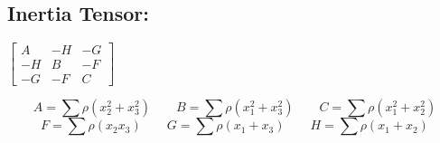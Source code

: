 \subsection{Inertia Tensor:}
$\begin{bmatrix}\label{ma:Inertia Tensor}
  A & -H & -G \\
  -H & B & -F \\
  -G & -F & C
\end{bmatrix}$

\begin{equation}\label{eq:Moments of Inertia}
A=\sum\rho\left({x}_{2}^{2}+{x}_{3}^{2}\right)
\qquad
B=\sum\rho\left({x}_{1}^{2}+{x}_{3}^{2}\right)
\qquad
C=\sum\rho\left({x}_{1}^{2}+{x}_{2}^{2}\right)
\end{equation}
\begin{equation}\label{eq:Product of Inertia}
F=\sum\rho\left({x}_{2}{x}_{3}\right)
\qquad
G=\sum\rho\left({x}_{1}+{x}_{3}\right)
\qquad
H=\sum\rho\left({x}_{1}+{x}_{2}\right)
\end{equation}